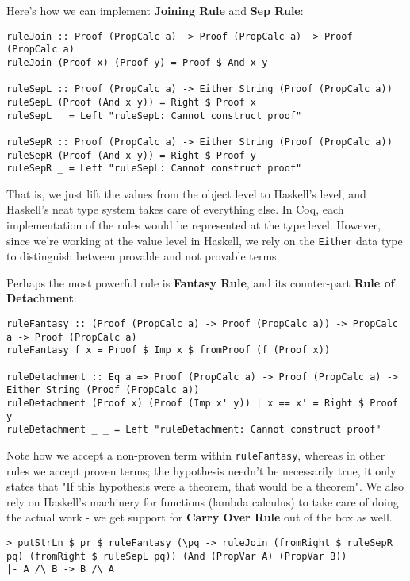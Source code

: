 \documentclass{article}
\begin{document}
Here's how we can implement \textbf{Joining Rule} and \textbf{Sep Rule}:

\begin{lstlisting}
ruleJoin :: Proof (PropCalc a) -> Proof (PropCalc a) -> Proof (PropCalc a)
ruleJoin (Proof x) (Proof y) = Proof $ And x y

ruleSepL :: Proof (PropCalc a) -> Either String (Proof (PropCalc a))
ruleSepL (Proof (And x y)) = Right $ Proof x
ruleSepL _ = Left "ruleSepL: Cannot construct proof"

ruleSepR :: Proof (PropCalc a) -> Either String (Proof (PropCalc a))
ruleSepR (Proof (And x y)) = Right $ Proof y
ruleSepR _ = Left "ruleSepL: Cannot construct proof"
\end{lstlisting}

That is, we just lift the values from the object level to Haskell's level, and Haskell's neat type system takes care of everything else. In Coq, each implementation of the rules would be represented at the type level. However, since we're working at the value level in Haskell, we rely on the \texttt{Either} data type to distinguish between provable and not provable terms.

Perhaps the most powerful rule is \textbf{Fantasy Rule}, and its counter-part \textbf{Rule of Detachment}:

\begin{lstlisting}
ruleFantasy :: (Proof (PropCalc a) -> Proof (PropCalc a)) -> PropCalc a -> Proof (PropCalc a)
ruleFantasy f x = Proof $ Imp x $ fromProof (f (Proof x))

ruleDetachment :: Eq a => Proof (PropCalc a) -> Proof (PropCalc a) -> Either String (Proof (PropCalc a))
ruleDetachment (Proof x) (Proof (Imp x' y)) | x == x' = Right $ Proof y
ruleDetachment _ _ = Left "ruleDetachment: Cannot construct proof"
\end{lstlisting}

Note how we accept a non-proven term within \texttt{ruleFantasy}, whereas in other rules we accept proven terms; the hypothesis needn't be necessarily true, it only states that "If this hypothesis were a theorem, that would be a theorem". We also rely on Haskell's machinery for functions (lambda calculus) to take care of doing the actual work - we get support for \textbf{Carry Over Rule} out of the box as well.

\begin{lstlisting}
> putStrLn $ pr $ ruleFantasy (\pq -> ruleJoin (fromRight $ ruleSepR pq) (fromRight $ ruleSepL pq)) (And (PropVar A) (PropVar B))
|- A /\ B -> B /\ A
\end{lstlisting}
\end{document}

